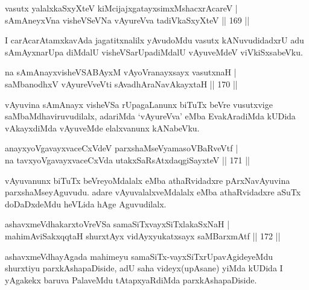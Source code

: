 \begin{shl}
vasutx yalalxkaSxyXteV kiMcijajxgatayxsimxMshacxrAcareV |\\
sAmAneyxVna visheVSeVNa vAyureVva tadiVkaSxyXteV \hfill || 169 ||
\end{shl}

\begin{artha}
I carAcarAtamxkavAda jagatitxnalilx yAvudoMdu vasutx kANuvu\-\break didadxrU adu sAmAyxnarUpa diMdalU visheVSarUpadiMdalU vAyuveMdeV viVkiSxsabeVku.
\end{artha}

\begin{shl}
na sAmAnayxvisheVSABAyxM vAyoVranayxsayx vasutxnaH |\\
saMbanodhxV vAyureVveVti sAvadhAraNavAkayxtaH \hfill || 170 ||
\end{shl}

\begin{artha}
vAyuvina sAmAnayx visheVSa rUpagaLanunx biTuTx beVre vusutxvige saMbaMdhaviruvudilalx, adariMda `vAyureVva' eMba EvakAradiMda kUDida vAkayxdiMda vAyuveMde elalxvanunx kANabeVku.
\end{artha}


\begin{shl}
anayxyoVgavayxvaceCxVdeV parxshaMseVyamasoVBaRveVtf |\\
na tavxyoVgavayxvaceCxVda utakxSaRsAtxdaqgiSayxteV \hfill || 171 ||
\end{shl}

\begin{artha}
vAyuvanunx biTuTx beVreyoMdalalx eMba athaRvidadxre pArxNavAyuvina parxshaMseyAguvudu. adare vAyuvalalxveMdalalx eMba athaRvidadxre aSuTx doDaDxdeMdu heVLida hAge Aguvudilalx.
\end{artha}


\begin{shl}
ashavxmeVdhakarxtoVreVSa samaSiTxvayxSiTxlakaSxNaH |\\
mahimA\s \s viSakxqqtaH shurxtAyx vidAyxyukatxsayx saMBarxmAtf \hfill || 172 ||
\end{shl}

\begin{artha}
ashavxmeVdhayAgada mahimeyu samaSiTx-vayxSiTxrUpavAgide\-\break yeMdu shurxtiyu parxkAshapaDiside, adU saha videyx(upAsane) yiMda kUDida I yAgakekx baruva PalaveMdu tAtapxyaRdiMda parxkAshapaDiside.
\end{artha}

